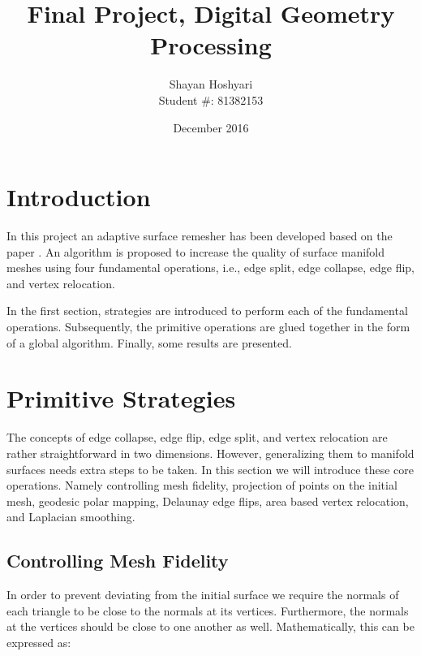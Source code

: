 \documentclass[letter,11pt]{article}
\title{Final Project, Digital Geometry Processing}
\date{December 2016}
\author{Shayan Hoshyari\\ Student \#: 81382153}
\begin{document}
\maketitle

\section*{Introduction}

In this project an adaptive surface remesher has been developed based
on the paper \cite{explicit}. An algorithm is proposed to increase the
quality of surface manifold meshes using four fundamental operations,
i.e., edge split, edge collapse, edge flip, and vertex
relocation.

In the first section, strategies are introduced to perform each of the
fundamental operations. Subsequently, the primitive operations are
glued together in the form of a global algorithm. Finally, some
results are presented.

\section*{Primitive Strategies}

The concepts of edge collapse, edge flip, edge split, and
vertex relocation are rather straightforward in two
dimensions. However, generalizing them to manifold surfaces needs
extra steps to be taken. In this section we will introduce these core
operations. Namely controlling mesh fidelity, projection of points on
the initial mesh, geodesic polar mapping, Delaunay edge flips, area
based vertex relocation, and Laplacian smoothing.

\subsection*{Controlling Mesh Fidelity}

In order to prevent deviating from the initial surface we require the
normals of each triangle to be close to the normals at its
vertices. Furthermore, the normals at the vertices should be close to
one another as well. Mathematically, this can be expressed as:
\end{document}
